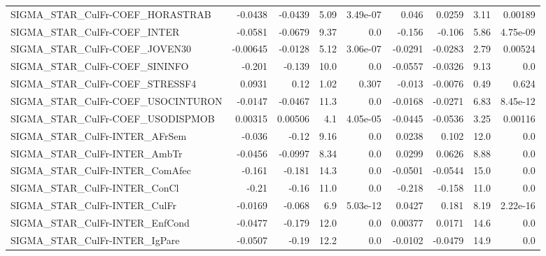 \begin{tabular}{lrrrrrrrr}
SIGMA\_STAR\_CulFr-COEF\_HORASTRAB        &     -0.0438 &      -0.0439 &    5.09 & 3.49e-07 &      0.046 &      0.0259 &         3.11 &       0.00189 \\
SIGMA\_STAR\_CulFr-COEF\_INTER            &     -0.0581 &      -0.0679 &    9.37 &      0.0 &     -0.156 &      -0.106 &         5.86 &      4.75e-09 \\
SIGMA\_STAR\_CulFr-COEF\_JOVEN30          &    -0.00645 &      -0.0128 &    5.12 & 3.06e-07 &    -0.0291 &     -0.0283 &         2.79 &       0.00524 \\
SIGMA\_STAR\_CulFr-COEF\_SININFO          &      -0.201 &       -0.139 &    10.0 &      0.0 &    -0.0557 &     -0.0326 &         9.13 &           0.0 \\
SIGMA\_STAR\_CulFr-COEF\_STRESSF4         &      0.0931 &         0.12 &    1.02 &    0.307 &     -0.013 &     -0.0076 &         0.49 &         0.624 \\
SIGMA\_STAR\_CulFr-COEF\_USOCINTURON      &     -0.0147 &      -0.0467 &    11.3 &      0.0 &    -0.0168 &     -0.0271 &         6.83 &      8.45e-12 \\
SIGMA\_STAR\_CulFr-COEF\_USODISPMOB       &     0.00315 &      0.00506 &     4.1 & 4.05e-05 &    -0.0445 &     -0.0536 &         3.25 &       0.00116 \\
SIGMA\_STAR\_CulFr-INTER\_AFrSem          &      -0.036 &        -0.12 &    9.16 &      0.0 &     0.0238 &       0.102 &         12.0 &           0.0 \\
SIGMA\_STAR\_CulFr-INTER\_AmbTr           &     -0.0456 &      -0.0997 &    8.34 &      0.0 &     0.0299 &      0.0626 &         8.88 &           0.0 \\
SIGMA\_STAR\_CulFr-INTER\_ComAfec         &      -0.161 &       -0.181 &    14.3 &      0.0 &    -0.0501 &     -0.0544 &         15.0 &           0.0 \\
SIGMA\_STAR\_CulFr-INTER\_ConCl           &       -0.21 &        -0.16 &    11.0 &      0.0 &     -0.218 &      -0.158 &         11.0 &           0.0 \\
SIGMA\_STAR\_CulFr-INTER\_CulFr           &     -0.0169 &       -0.068 &     6.9 & 5.03e-12 &     0.0427 &       0.181 &         8.19 &      2.22e-16 \\
SIGMA\_STAR\_CulFr-INTER\_EnfCond         &     -0.0477 &       -0.179 &    12.0 &      0.0 &    0.00377 &      0.0171 &         14.6 &           0.0 \\
SIGMA\_STAR\_CulFr-INTER\_IgPare          &     -0.0507 &        -0.19 &    12.2 &      0.0 &    -0.0102 &     -0.0479 &         14.9 &           0.0 \\

\end{tabular}
